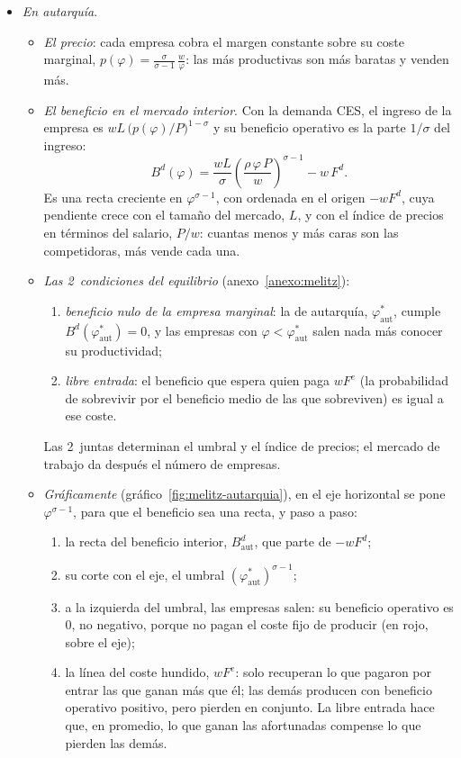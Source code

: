 \documentclass[11pt]{article}
\begin{document}
\begin{itemize}
\item \emph{En autarquía}.
  \begin{itemize}
  \item \emph{El precio}: cada empresa cobra el margen constante sobre su coste marginal, $p(\varphi)=\frac{\sigma}{\sigma-1}\,\frac{w}{\varphi}$: las más productivas son más baratas y venden más.
  \item \emph{El beneficio en el mercado interior}. Con la demanda CES, el ingreso de la empresa es $wL\,\big(p(\varphi)/P\big)^{1-\sigma}$ y su beneficio operativo es la parte $1/\sigma$ del ingreso:
  $$B^d(\varphi)=\frac{wL}{\sigma}\left(\frac{\rho\,\varphi\,P}{w}\right)^{\sigma-1}-w\,F^d.$$
  Es una recta creciente en $\varphi^{\sigma-1}$, con ordenada en el origen $-wF^d$, cuya pendiente crece con el tamaño del mercado, $L$, y con el índice de precios en términos del salario, $P/w$: cuantas menos y más caras son las competidoras, más vende cada una.
  \item \emph{Las 2~condiciones del equilibrio} (anexo~\ref{anexo:melitz}):
    \begin{enumerate}
    \item \emph{beneficio nulo de la empresa marginal}: la  de autarquía, $\varphi^*_{\mathrm{aut}}$, cumple $B^d(\varphi^*_{\mathrm{aut}})=0$, y las empresas con $\varphi<\varphi^*_{\mathrm{aut}}$ salen nada más conocer su productividad;
    \item \emph{libre entrada}: el beneficio que espera quien paga $wF^e$ (la probabilidad de sobrevivir por el beneficio medio de las que sobreviven) es igual a ese coste.
    \end{enumerate}
    Las 2~juntas determinan el umbral y el índice de precios; el mercado de trabajo da después el número de empresas.
  \item \emph{Gráficamente} (gráfico~\ref{fig:melitz-autarquia}), en el eje horizontal se pone $\varphi^{\sigma-1}$, para que el beneficio sea una recta, y paso a paso:
    \begin{enumerate}
    \item la recta del beneficio interior, $B^d_{\mathrm{aut}}$, que parte de $-wF^d$;
    \item su corte con el eje, el umbral $(\varphi^*_{\mathrm{aut}})^{\sigma-1}$;
    \item a la izquierda del umbral, las empresas salen: su beneficio operativo es 0, no negativo, porque no pagan el coste fijo de producir (en rojo, sobre el eje);
    \item la línea del coste hundido, $wF^e$: solo recuperan lo que pagaron por entrar las que ganan más que él; las demás producen con beneficio operativo positivo, pero pierden en conjunto. La libre entrada hace que, en promedio, lo que ganan las afortunadas compense lo que pierden las demás.
    \end{enumerate}
  \end{itemize}
\end{itemize}
\end{document}
